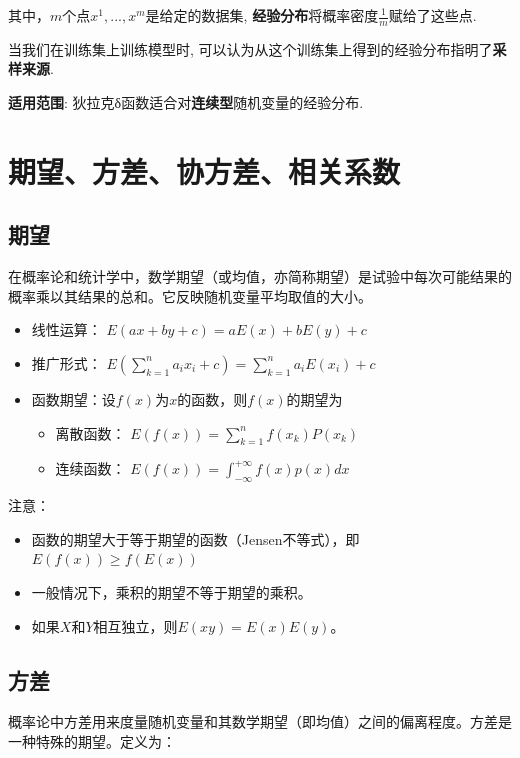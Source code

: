 其中，$m$个点$x^{1},...,x^{m}$是给定的数据集, {\bf 经验分布}将概率密度$\frac{1}{m}$赋给了这些点.

当我们在训练集上训练模型时, 可以认为从这个训练集上得到的经验分布指明了{\bf 采样来源}.

{\bf 适用范围}: 狄拉克δ函数适合对{\bf 连续型}随机变量的经验分布.

\section{期望、方差、协方差、相关系数}

\subsection{期望}

在概率论和统计学中，数学期望（或均值，亦简称期望）是试验中每次可能结果的概率乘以其结果的总和。它反映随机变量平均取值的大小。

\begin{itemize}\itemsep0em
		\item 线性运算： $E(ax+by+c) = aE(x)+bE(y)+c$  
		\item 推广形式： $E(\sum_{k=1}^{n}{a_ix_i+c}) = \sum_{k=1}^{n}{a_iE(x_i)+c}$ 
		\item 函数期望：设$f(x)$为$x$的函数，则$f(x)$的期望为
		\begin{itemize}\itemsep0em
				\item 离散函数： $E(f(x))=\sum_{k=1}^{n}{f(x_k)P(x_k)}$
				\item 连续函数： $E(f(x))=\int_{-\infty}^{+\infty}{f(x)p(x)dx}$
		\end{itemize}
\end{itemize}

注意：

\begin{itemize}\itemsep0em
		\item 函数的期望大于等于期望的函数（Jensen不等式），即$E(f(x))\geqslant f(E(x))$  
		\item 一般情况下，乘积的期望不等于期望的乘积。  
		\item 如果$X$和$Y$相互独立，则$E(xy)=E(x)E(y)$。  
\end{itemize}

\subsection{方差}

概率论中方差用来度量随机变量和其数学期望（即均值）之间的偏离程度。方差是一种特殊的期望。定义为：

